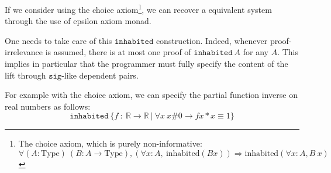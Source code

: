 \documentclass[a4paper,11pt]{article}
\newcommand{\R}{\mathbb{R}}
\newcommand{\Type}{\mbox{Type}}
\theoremstyle{definition}
\theoremstyle{remark}
\begin{document}
  
  If we consider using the choice axiom\footnote{The choice axiom, which is purely non-informative:\\$\forall (A:\Type)\ (B:A→\Type), (\forall x:A,\ \mbox{inhabited}(B x)) \Rightarrow \mbox{inhabited}(\forall x:A, B~x)$}, we can recover a equivalent system through the use of epsilon axiom monad.
  

  One needs to take care of this $\mathtt{inhabited}$ construction. Indeed, whenever proof-irrelevance is assumed, there is at most one proof of $\mathtt{inhabited}\ A$ for any $A$. This implies in particular that the programmer must fully specify the content of the lift through $\mathtt{sig}$-like dependent pairs.

  For example with the choice axiom, we can specify the partial function inverse on real numbers as follows:
  $$\mathtt{inhabited}\ \{f\ :\ \R → \R\ |\ \forall x\ x \# 0 → f x * x ≡ 1\}$$

  
  
\end{document}
